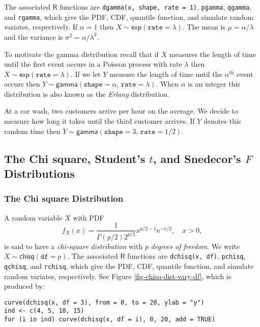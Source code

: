The associated \(\mathsf{R}\) functions are \texttt{dgamma(x, shape, rate =
1)}, \texttt{pgamma}, \texttt{qgamma}, and \texttt{rgamma}, which give the PDF, CDF,
quantile function, and simulate random variates, respectively. If
\(\alpha=1\) then \(X\sim\mathsf{exp}(\mathtt{rate}=\lambda)\). The
mean is \(\mu=\alpha/\lambda\) and the variance is
\(\sigma^{2}=\alpha/\lambda^{2}\).

To motivate the gamma distribution recall that if \(X\) measures the
length of time until the first event occurs in a Poisson process with
rate \(\lambda\) then \(X\sim\mathsf{exp}(\mathtt{rate}=\lambda)\). If
we let \(Y\) measure the length of time until the
\(\alpha^{\mathrm{th}}\) event occurs then
\(Y\sim\mathsf{gamma}(\mathtt{shape}=\alpha,\,\mathtt{rate}=\lambda)\). When
\(\alpha\) is an integer this distribution is also known as the
\emph{Erlang} distribution.


At a car wash, two customers arrive per hour on the average. We decide
to measure how long it takes until the third customer arrives. If
\(Y\) denotes this random time then
\(Y\sim\mathsf{gamma}(\mathtt{shape}=3,\,\mathtt{rate}=1/2)\).

\subsection{The Chi square, Student's \(t\), and Snedecor's \(F\) Distributions}
\label{sec-6-5-2}

\subsubsection{The Chi square Distribution}
\label{sec-6-5-2-1}

A random variable \(X\) with PDF
\begin{equation}
f_{X}(x)=\frac{1}{\Gamma(p/2)2^{p/2}}x^{p/2-1}\mathrm{e}^{-x/2},\quad x>0,
\end{equation}
is said to have a \emph{chi-square distribution} with \(p\) \emph{degrees of
freedom}. We write \(X\sim\mathsf{chisq}(\mathtt{df}=p)\). The
associated \(\mathsf{R}\) functions are \texttt{dchisq(x, df)}, \texttt{pchisq},
\texttt{qchisq}, and \texttt{rchisq}, which give the PDF, CDF, quantile function,
and simulate random variates, respectively. See Figure
\ref{fig-chisq-dist-vary-df}, which is produced by:

\begin{Verbatim}
curve(dchisq(x, df = 3), from = 0, to = 20, ylab = "y")
ind <- c(4, 5, 10, 15)
for (i in ind) curve(dchisq(x, df = i), 0, 20, add = TRUE)
\end{Verbatim}

